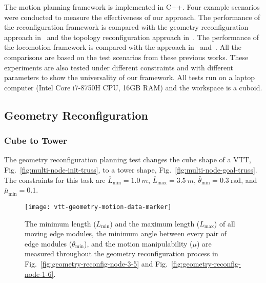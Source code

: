 \documentclass[journal]{IEEEtran}
\begin{document}
The motion planning framework is implemented in C++. Four example
scenarios were conducted to measure the effectiveness of our
approach. The performance of the reconfiguration framework is compared
with the geometry reconfiguration approach
in~\cite{vtt-review-ur-2018} and the topology reconfiguration approach
in~\cite{Liu-vtt-planning-iros-2019}. The performance of the
locomotion framework is compared with the approach
in~\cite{Park-vtt-locomotion-ral-2020}
and~\cite{Usevitch-lar-locomotion-tro-2020}. All the comparisons are
based on the test scenarios from these previous works. These
experiments are also tested under different constraints and with
different parameters to show the universality of our framework. All
tests run on a laptop computer (Intel Core i7-8750H CPU, 16GB RAM) and
the workspace is a cuboid.

\subsection{Geometry Reconfiguration}

\subsubsection{Cube to Tower}

The geometry reconfiguration planning test changes the cube shape of a
VTT, Fig.~\ref{fig:multi-node-init-truss}, to a tower shape,
Fig.~\ref{fig:multi-node-goal-truss}.  The constraints for this task
are $\overline{L}_{\min}=\SI{1.0}{m}$,
$\overline{L}_{\max}=\SI{3.5}{m}$,
$\bar{\theta}_{\min}=\SI{0.3}{\radian}$, and $\bar{\mu}_{\min}=0.1$.

\begin{figure}[t]
  \centering
  \texttt{[image: vtt-geometry-motion-data-marker]}
  \caption{The minimum length ($L_{\min}$) and the maximum length
    ($L_{\max}$) of all moving edge modules, the minimum angle between
    every pair of edge modules ($\theta_{\min}$), and the motion
    manipulability ($\mu$) are measured throughout the geometry
    reconfiguration process in
    Fig.~\ref{fig:geometry-reconfig-node-3-5} and
    Fig.~\ref{fig:geometry-reconfig-node-1-6}.}
  \label{fig:geometry-test-data}
\end{figure}
\end{document}
